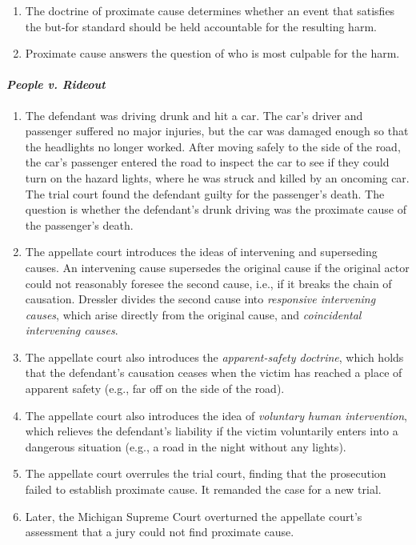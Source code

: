 \begin{enumerate}
    \item The doctrine of proximate cause determines whether an event that satisfies the but-for standard should be held accountable for the resulting harm.
    \item Proximate cause answers the question of who is most culpable for the harm.
\end{enumerate}

\paragraph{\emph{People v. Rideout}}

\begin{enumerate}
    \item The defendant was driving drunk and hit a car. The car's driver and passenger suffered no major injuries, but the car was damaged enough so that the headlights no longer worked. After moving safely to the side of the road, the car's passenger entered the road to inspect the car to see if they could turn on the hazard lights, where he was struck and killed by an oncoming car. The trial court found the defendant guilty for the passenger's death. The question is whether the defendant's drunk driving was the proximate cause of the passenger's death.
    \item The appellate court introduces the ideas of intervening and superseding causes. An intervening cause supersedes the original cause if the original actor could not reasonably foresee the second cause, i.e., if it breaks the chain of causation. Dressler divides the second cause into \emph{responsive intervening causes}, which arise directly from the original cause, and \emph{coincidental intervening causes}.
    \item The appellate court also introduces the \emph{apparent-safety doctrine}, which holds that the defendant's causation ceases when the victim has reached a place of apparent safety (e.g., far off on the side of the road).
    \item The appellate court also introduces the idea of \emph{voluntary human intervention}, which relieves the defendant's liability if the victim voluntarily enters into a dangerous situation (e.g., a road in the night without any lights).
    \item The appellate court overrules the trial court, finding that the prosecution failed to establish proximate cause. It remanded the case for a new trial.
    \item Later, the Michigan Supreme Court overturned the appellate court's assessment that a jury could not find proximate cause.

\end{enumerate}
